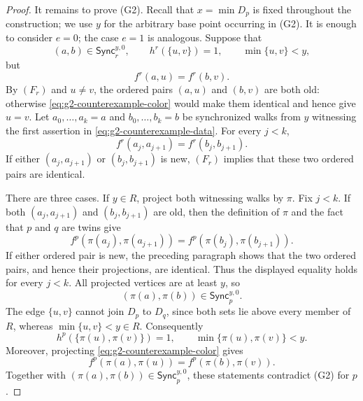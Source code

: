 \documentclass[10pt,a4paper]{amsart}
\numberwithin{equation}{section}
\theoremstyle{definition}
\theoremstyle{remark}
\begin{document}
\begin{proof}
It remains to prove (G2).  Recall that $x=\min D_p$ is fixed throughout
the construction; we use $y$ for the arbitrary base point occurring
in (G2).  It is enough to consider $e=0$; the case $e=1$ is analogous.
Suppose that
\begin{equation}\label{eq:g2-counterexample-data}
 (a,b)\in\mathsf{Sync}^{y,0}_r,\qquad h^r(\{u,v\})=1,\qquad
 \min\{u,v\}<y,
\end{equation}
but
\begin{equation}\label{eq:g2-counterexample-color}
 f^r(a,u)=f^r(b,v).
\end{equation}
By $(F_r)$ and $u\ne v$, the ordered pairs $(a,u)$ and $(b,v)$ are
both old: otherwise \eqref{eq:g2-counterexample-color} would make them
identical and hence give $u=v$.
Let $a_0,\ldots,a_k=a$ and $b_0,\ldots,b_k=b$ be synchronized walks
from $y$ witnessing the first assertion in
\eqref{eq:g2-counterexample-data}.  For every $j<k$,
\begin{displaymath}
 f^r(a_j,a_{j+1})=f^r(b_j,b_{j+1}).
\end{displaymath}
If either $(a_j,a_{j+1})$ or $(b_j,b_{j+1})$ is new, $(F_r)$ implies
that these two ordered pairs are identical.

There are three cases.  If $y\in R$, project both witnessing walks by
$\pi$.  Fix $j<k$.  If both $(a_j,a_{j+1})$ and
$(b_j,b_{j+1})$ are old, then the definition of $\pi$ and the fact that
$p$ and $q$ are twins give
\begin{displaymath}
 f^p(\pi(a_j),\pi(a_{j+1}))
 =f^p(\pi(b_j),\pi(b_{j+1})).
\end{displaymath}
If either ordered pair is new, the preceding paragraph shows that the
two ordered pairs, and hence their projections, are identical.  Thus
the displayed equality holds for every $j<k$.  All projected vertices
are at least $y$, so
\begin{displaymath}
 (\pi(a),\pi(b))\in\mathsf{Sync}^{y,0}_p.
\end{displaymath}
The edge $\{u,v\}$ cannot join $D_p$ to $D_q$, since both sets lie
above every member of $R$, whereas $\min\{u,v\}<y\in R$.  Consequently
\begin{displaymath}
 h^p(\{\pi(u),\pi(v)\})=1,
 \qquad \min\{\pi(u),\pi(v)\}<y.
\end{displaymath}
Moreover, projecting \eqref{eq:g2-counterexample-color} gives
\begin{displaymath}
 f^p(\pi(a),\pi(u))=f^p(\pi(b),\pi(v)).
\end{displaymath}
Together with
$(\pi(a),\pi(b))\in\mathsf{Sync}^{y,0}_p$, these statements contradict
(G2) for $p$.


\end{proof}
\end{document}
